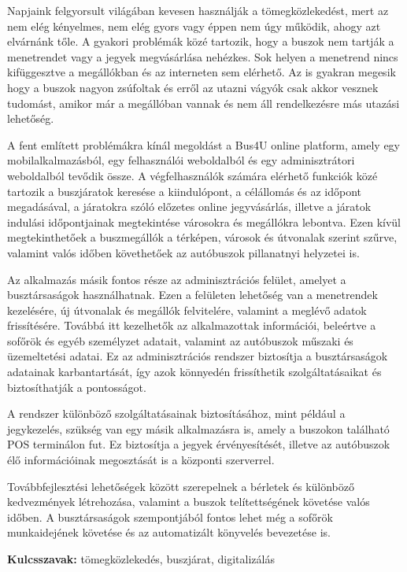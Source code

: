 Napjaink felgyorsult világában kevesen használják a tömegközlekedést, mert az nem elég kényelmes, nem elég gyors vagy éppen nem úgy működik, ahogy azt elvárnánk tőle. A gyakori problémák közé tartozik, hogy a buszok nem tartják a menetrendet vagy a jegyek megvásárlása nehézkes. Sok helyen a menetrend nincs kifüggesztve a megállókban és az interneten sem elérhető. Az is gyakran megesik hogy a buszok nagyon zsúfoltak és erről az utazni vágyók csak akkor vesznek tudomást, amikor már a megállóban vannak és nem áll rendelkezésre más utazási lehetőség.

A fent említett problémákra kínál megoldást a Bus4U online platform, amely egy mobilalkalmazásból, egy felhasználói weboldalból és egy adminisztrátori weboldalból tevődik össze. A végfelhasználók számára elérhető funkciók közé tartozik a buszjáratok keresése a kiindulópont, a célállomás és az időpont megadásával, a járatokra szóló előzetes online jegyvásárlás, illetve a járatok indulási időpontjainak megtekintése városokra és megállókra lebontva. Ezen kívül megtekinthetőek a buszmegállók a térképen, városok és útvonalak szerint szűrve, valamint valós időben követhetőek az autóbuszok pillanatnyi helyzetei is.

Az alkalmazás másik fontos része az adminisztrációs felület, amelyet a busztársaságok használhatnak. Ezen a felületen lehetőség van a menetrendek kezelésére, új útvonalak és megállók felvitelére, valamint a meglévő adatok frissítésére. Továbbá itt kezelhetők az alkalmazottak információi, beleértve a sofőrök és egyéb személyzet adatait, valamint az autóbuszok műszaki és üzemeltetési adatai. Ez az adminisztrációs rendszer biztosítja a busztársaságok adatainak karbantartását, így azok könnyedén frissíthetik szolgáltatásaikat és biztosíthatják a pontosságot.

A rendszer különböző szolgáltatásainak biztosításához, mint például a jegykezelés, szükség van egy másik alkalmazásra is, amely a buszokon található POS terminálon fut. Ez biztosítja a jegyek érvényesítését, illetve az autóbuszok élő információinak megosztását is a központi szerverrel.

Továbbfejlesztési lehetőségek között szerepelnek a bérletek és különböző kedvezmények létrehozása, valamint a buszok telítettségének követése valós időben. A busztársaságok szempontjából fontos lehet még a sofőrök munkaidejének követése és az automatizált könyvelés bevezetése is.


\textbf{Kulcsszavak:} tömegközlekedés, buszjárat, digitalizálás